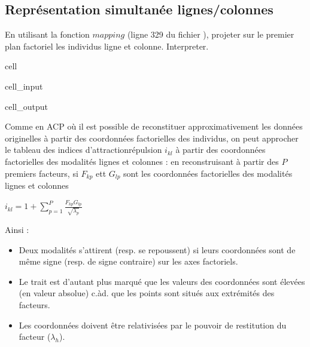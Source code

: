\documentclass[letterpaper,10pt,french]{sphinxmanual}
\begin{document}
\subsection{Représentation simultanée lignes/colonnes}
\label{\detokenize{TP3_AFC_ACM:representation-simultanee-lignes-colonnes}}
\sphinxAtStartPar
En utilisant la fonction \(mapping\) (ligne 329 du fichier ), projeter sur le premier plan factoriel les individus ligne et colonne. Interpreter.

\begin{sphinxuseclass}{cell}
\begin{sphinxuseclass}{cell_input}
\begin{sphinxVerbatim}[commandchars=\\\{\}]
\end{sphinxVerbatim}

\end{sphinxuseclass}
\begin{sphinxuseclass}{cell_output}
\noindent{}

\end{sphinxuseclass}
\end{sphinxuseclass}
\sphinxAtStartPar
Comme en ACP où il est possible de reconstituer approximativement les données originelles à partir des coordonnées factorielles des individus, on peut approcher le tableau des indices d’attraction\sphinxhyphen{}répulsion \(i_{kl}\) à partir des coordonnées factorielles des modalités lignes et colonnes : en reconstruisant à partir des \(P\) premiers facteurs, si \(F_{kp}\) ett \(G_{lp}\) sont les coordonnées factorielles des modalités lignes et colonnes

\sphinxAtStartPar
\(i_{kl} = 1+\displaystyle\sum_{p=1}^P \frac{F_{kp}G_{lp}}{\sqrt{\lambda_p}}\)

\sphinxAtStartPar
Ainsi :
\begin{itemize}
\item {} 
\sphinxAtStartPar
Deux modalités s’attirent (resp. se repoussent) si leurs coordonnées sont de même signe (resp. de signe contraire) sur les axes factoriels.

\item {} 
\sphinxAtStartPar
Le trait est d’autant plus marqué que les valeurs des coordonnées sont élevées (en valeur absolue) c.\sphinxhyphen{}à\sphinxhyphen{}d. que les points sont situés aux extrémités des facteurs.

\item {} 
\sphinxAtStartPar
Les  coordonnées doivent être relativisées par le pouvoir de restitution du facteur (\(\lambda_h\)).

\end{itemize}
\end{document}
